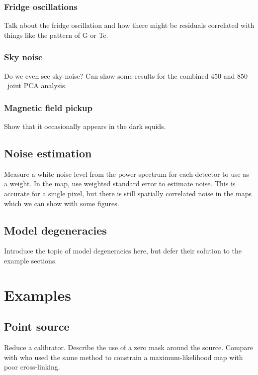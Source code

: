 \documentclass[useAMS,usenatbib,usegraphicx,nofootinbib]{mn2e}
\begin{document}
\subsubsection{Fridge oscillations}
Talk about the fridge oscillation and how there might be residuals
correlated with things like the pattern of G or Tc.

\subsubsection{Sky noise}
Do we even see sky noise? Can show some results for the combined 450
and 850\,\micron\ joint PCA analysis.

\subsubsection{Magnetic field pickup}
Show that it occasionally appears in the dark squids.




\subsection{Noise estimation}

Measure a white noise level from the power spectrum for each detector
to use as a weight. In the map, use weighted standard error to
estimate noise. This is accurate for a single pixel, but there is
still spatially correlated noise in the maps which we can show with
some figures.


\subsection{Model degeneracies}

Introduce the topic of model degeneracies here, but defer their
solution to the example sections.


\section{Examples}
\label{sec:examples}

\subsection{Point source}
Reduce a calibrator. Describe the use of a zero mask around the
source. Compare with \citet{wiebe2009} who used the same method to
constrain a maximum-likelihood map with poor cross-linking.
\end{document}
